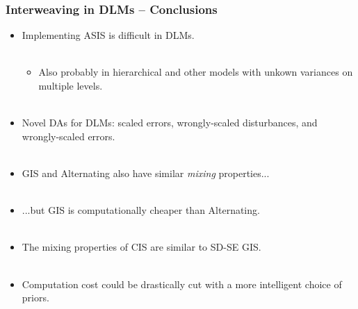 \documentclass[xcolor=dvipsnames]{beamer}
\begin{document}
\begin{frame}
\frametitle{Interweaving in DLMs -- Conclusions}
\begin{itemize}
\item Implementing ASIS is difficult in DLMs.\\~\\
\begin{itemize}
\item[]Also probably in hierarchical and other models with unkown variances on multiple levels.\\~\\
\end{itemize}

\item Novel DAs for DLMs: scaled errors, wrongly-scaled disturbances, and wrongly-scaled errors.\\~\\

\item GIS and Alternating also have similar {\it mixing} properties...\\~\\

\item ...but GIS is computationally cheaper than Alternating.\\~\\

\item The mixing properties of CIS are similar to SD-SE GIS.\\~\\

\item Computation cost could be drastically cut with a more intelligent choice of priors.

\end{itemize}
\end{frame}
\end{document}
